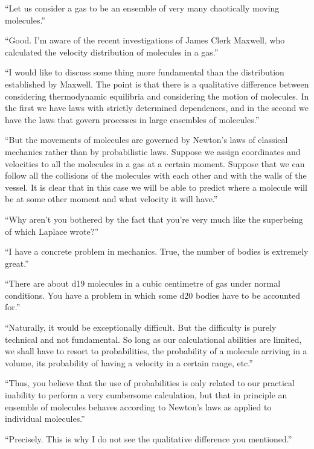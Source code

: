 \begin{dialogue}

\athr ``Let us consider a gas to be an ensemble of very many
chaotically moving molecules.''

\prtnr ``Good. I'm aware of the recent investigations of James
Clerk Maxwell, who calculated the velocity distribution of molecules
in a gas.'' 

\athr ``I would like to discuss some thing more fundamental than
the distribution established by Maxwell. The point is that there is a qualitative difference between considering thermodynamic equilibria and considering the motion of molecules. In the first we have  laws with strictly determined dependences, and in the second we have the  laws that govern processes in large ensembles of molecules.''

\prtnr	``But the movements of molecules are governed by Newton's laws of classical mechanics rather than by probabilistic laws. Suppose we assign coordinates and velocities to all the molecules in a gas at a certain moment. Suppose that we can follow all the collisions of the molecules with each other and with the walls of the vessel. It is clear that in this case we will be able to predict where a molecule will be at some other moment and what velocity it will have.''


\athr ``Why aren't you bothered by the fact that you're very much like the superbeing of which Laplace wrote?''

\prtnr ``I have a concrete problem in mechanics. True, the number of bodies is extremely great.''

\athr ``There are about \num{d19} molecules in a cubic centimetre of gas under normal conditions. You have a problem in which some \num{d20} bodies have to be accounted for.''

\prtnr ``Naturally, it would be exceptionally difficult. But the difficulty is purely technical and not fundamental. So long as our calculational abilities are limited, we shall have to resort to probabilities, the probability of a molecule arriving in a volume, its probability of having a velocity in a certain range, etc.''


\athr ``Thus, you believe that the use of probabilities is only related to our practical inability to perform a very cumbersome calculation, but that in principle an ensemble of molecules behaves according to Newton's laws as applied to individual molecules.''

\prtnr ``Precisely. This is why I do not see the qualitative difference you mentioned.''


\end{dialogue}
